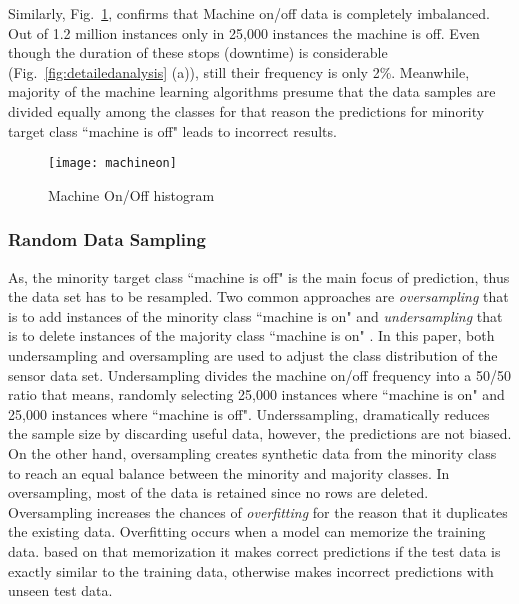 \documentclass[runningheads]{llncs}
\begin{document}
Similarly, Fig.~\ref{fig:machineon2},  confirms that Machine on/off data is completely imbalanced. Out of 1.2 million instances only in 25,000 instances the machine is off. Even though the duration of these stops (downtime) is considerable (Fig.~\ref{fig:detailedanalysis} (a)), still their frequency is only 2\%. Meanwhile, majority of the machine learning algorithms presume that the data samples are divided equally among the classes for that reason the predictions for minority target class ``machine is off" leads to incorrect results.



\begin{figure}
\centering
\texttt{[image: machineon]} 
\caption{Machine On/Off histogram}
\label{fig:machineon2}
\end{figure}



\subsubsection {Random Data Sampling}
\label{sec:sampling}
As, the minority target class ``machine is off" is the main focus of prediction, thus the data set has to be resampled. Two common approaches are \emph{oversampling} that is to add instances of the minority class ``machine is on" and \emph{undersampling} that is to delete instances of the majority class ``machine is on" \cite{Gonzales}. In this paper, both undersampling and oversampling are used to adjust the class distribution of the sensor data set. Undersampling divides the machine on/off frequency into a 50/50 ratio that means, randomly selecting 25,000 instances where ``machine is on" and 25,000 instances where ``machine is off". Underssampling, dramatically reduces the sample size by discarding useful data, however, the predictions are not biased. On the other hand, oversampling creates synthetic data from the minority class to reach an equal balance between the minority and majority classes. In oversampling, most of the data is retained since no rows are deleted. Oversampling increases the chances of \emph{overfitting} for the reason that it duplicates the existing data. Overfitting occurs when a model can memorize the training data. based on that memorization it makes correct predictions if the test data is exactly similar to the training data, otherwise makes incorrect predictions with unseen test data.
\end{document}
